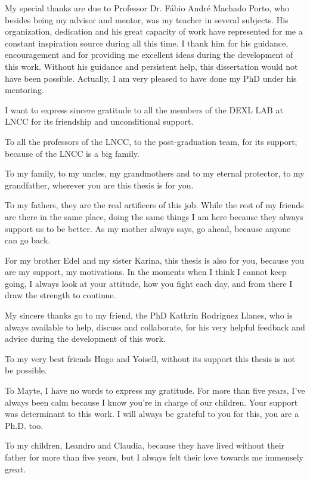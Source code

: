 \documentclass[
	12pt,				%
	openright,			%
	oneside,			%
	a4paper,			%
	sumario=tradicional,%
	brazil,			%
	french,				%
	spanish,			%
	english				%
	]{abntex2}
\theoremstyle{plain}
\theoremstyle{definition}
\begin{document}
\begin{agradecimentos}
My  special  thanks  are  due  to  Professor  Dr. Fábio André Machado Porto,  who 
besides  being  my  advisor  and  mentor,  was  my  teacher  in  several  subjects.  His 
organization, dedication and his great capacity of work have represented for me a  constant  inspiration  source  during  all  this  time.  I  thank  him  for  his  guidance,  encouragement  and  for  providing  me  excellent  ideas  during  the  development  of this  work.  Without  his  guidance and  persistent  help, this  dissertation  would  not have  been  possible.  Actually,  I  am  very  pleased  to  have  done  my  PhD  under  his mentoring. 

I want to express sincere gratitude to all the members of the DEXL LAB at LNCC for its friendship and unconditional support.

To all the professors of the LNCC, to the post-graduation team, for its support; because of the LNCC is a big family.

To my family, to my uncles, my grandmothers and to my eternal protector, to my grandfather, wherever you are this thesis is for you.

To my fathers, they are the real artificers of this job. While the rest of my friends are there in the same place, doing the same things I am here because they always support us to be better. As my mother always says, go ahead, because anyone can go back.

For my brother Edel and my sister Karina, this thesis is also for you, because you are my support, my motivations. In the moments when I think I cannot keep going, I always look at your attitude, how you fight each day, and from there I draw the strength to continue.

My sincere thanks go to my friend, the PhD Kathrin Rodriguez Llanes, who is  always  available  to  help,  discuss  and  collaborate,  for  his  very  helpful  feedback 
and advice during the development of this work.

To my very best friends Hugo and Yoisell, without its support this thesis is not be possible.

To Mayte, I have no words to express my gratitude. For more than five years, I've always been calm because I know you're in charge of our children. Your support was determinant to this work. I will always be grateful to you for this, you are a Ph.D. too.

To my children, Leandro and Claudia, because they have lived without their father for more than five years, but I always felt their love towards me immensely great.

\end{agradecimentos}
\end{document}
